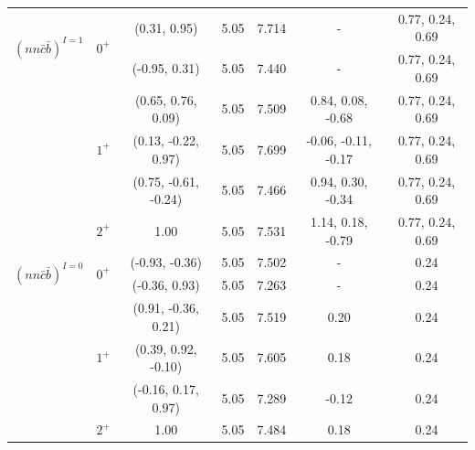 \documentclass[prd,twocolumn,floatfix,nofootinbib]{revtex4}
\begin{document}
\begin{table}[!htbp]
\begin{tabular}{ccccccc}
        \multirow{2}{*}{${(nn\bar{c}\bar{b})}^{I=1}$}
                        &\multirow{2}{*}{$0^{+}$}
                                    &(0.31, 0.95)           &5.05	    &7.714	    &-                      &0.77, 0.24, 0.69 \\ 
                        &           &(-0.95, 0.31)          &5.05	    &7.440	    &-                      &0.77, 0.24, 0.69 \\ 
                        &\multirow{3}{*}{$1^{+}$}
                                    &(0.65, 0.76, 0.09)     &5.05	    &7.509	    &0.84, 0.08, -0.68      &0.77, 0.24, 0.69 \\ 
                        &           &(0.13, -0.22, 0.97)    &5.05	    &7.699	    &-0.06, -0.11, -0.17    &0.77, 0.24, 0.69 \\ 
                        &           &(0.75, -0.61, -0.24)   &5.05	    &7.466	    &0.94, 0.30, -0.34      &0.77, 0.24, 0.69 \\ 
                        &$2^{+}$    &1.00                   &5.05	    &7.531	    &1.14, 0.18, -0.79      &0.77, 0.24, 0.69 \\ 
        \multirow{2}{*}{${(nn\bar{c}\bar{b})}^{I=0}$}
                        &\multirow{2}{*}{$0^{+}$}
                                    &(-0.93, -0.36)         &5.05	    &7.502	    &-                      &0.24 \\ 
                        &           &(-0.36, 0.93)          &5.05	    &7.263	    &-                      &0.24 \\ 
                        &\multirow{3}{*}{$1^{+}$}
                                    &(0.91, -0.36, 0.21)    &5.05	    &7.519	    &0.20                   &0.24 \\ 
                        &           &(0.39, 0.92, -0.10)    &5.05	    &7.605	    &0.18                   &0.24 \\ 
                        &           &(-0.16, 0.17, 0.97)    &5.05	    &7.289	    &-0.12                  &0.24 \\ 
                        &$2^{+}$    &1.00                   &5.05	    &7.484	    &0.18                   &0.24 \\ 
        \hline\hline
    \end{tabular}
\end{table}
\end{document}
